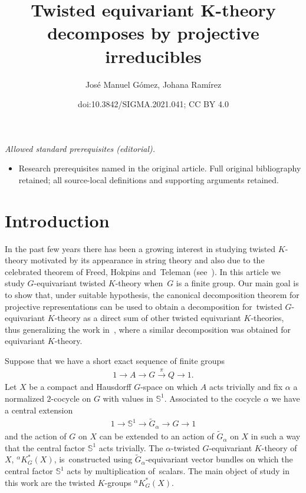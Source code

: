 \documentclass[10pt,a4paper]{amsart}
\title{Twisted equivariant K-theory decomposes by projective irreducibles}
\author{José Manuel Gómez, Johana Ramírez}
\date{doi:10.3842/SIGMA.2021.041; CC BY 4.0}
\def\S{\mathbb{S}}
\theoremstyle{definition}
\numberwithin{equation}{section}
\begin{document}
\maketitle
\noindent\textit{Allowed standard prerequisites (editorial).}\begin{itemize}
\item Research prerequisites named in the original article. Full original bibliography retained; all source-local definitions and supporting arguments retained.
\end{itemize}\medskip
\section{Introduction}

In the past few years there has been a growing interest in studying
twisted $K$-theory motivated by its appearance in string theory and also due
to the celebrated theorem of Freed, Hokpins and~Teleman (see~\cite[Theorem~1]{FHT}).
In this article we study $G$-equivariant twisted $K$-theory when~$G$ is a finite group.
Our main goal is to show that, under suitable hypothesis, the canonical decomposition
theorem for projective representations can be used to obtain a decomposition for~twisted
$G$-equivariant $K$-theory as a direct sum of other twisted equivariant $K$-theories,
thus generalizing the work in~\cite{GomezUribe}, where a similar decomposition was obtained for
equivariant $K$-theory.

Suppose that we have a short exact sequence of finite groups
\begin{gather*}
1\rightarrow A\rightarrow G\stackrel{\pi}{\rightarrow} Q\rightarrow 1.
\end{gather*}
Let $X$ be a compact and Hausdorff $G$-space on which $A$ acts trivially and fix
$\alpha$ a normalized $2$-cocycle on $G$ with values in $\S^{1}$. Associated to the
cocycle $\alpha$ we have a central extension
\begin{gather*}
1\rightarrow \S^{1}\rightarrow
\widetilde{G}_{\alpha}\rightarrow G\rightarrow 1
\end{gather*}
and the action of $G$ on $X$ can be extended to an action of $\widetilde{G}_{\alpha}$ on $X$
in such a way that the central factor $\S^{1}$ acts trivially. The $\alpha$-twisted
$G$-equivariant $K$-theory of $X$, $^{\alpha}K^{\ast}_{G}(X)$, is~constructed
\mbox{using} $\widetilde{G}_{\alpha}$-equivariant vector bundles on which the central factor
$\S^{1}$ acts by multiplication of~scalars. The main object of study in this work are
the twisted $K$-groups $^{\alpha}K^{\ast}_{G}(X)$.
\end{document}
